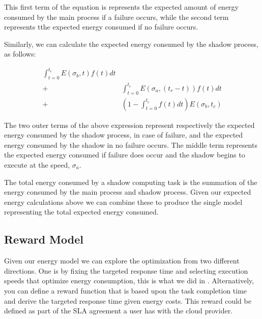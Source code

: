 This first term of the equation is represents the expected amount of
energy consumed by the main process if a failure occurs, while the
second term represents tthe expected energy consumed if no failure
occurs.

Similarly, we can calculate the expected energy consumed by the shadow
process, as follows:

\begin{equation}
\begin{split}
\int_{t=0}^{t_c}E(\sigma_b,t)f(t)dt \\
+& \int_{t=0}^{t_c}E(\sigma_a,(t_r-t))f(t)dt \\
+& (1-\int_{t=0}^{t_c}f(t)dt)E(\sigma_b,t_c)
\end{split}
\end{equation}

The two outer terms of the above expression represent respectively the
expected energy consumed by the shadow process, in case of failure,
and the expected energy consumed by the shadow in no failure
occurs. The middle term represents the expected energy consumed if
failure does occur and the shadow begins to execute at the speed,
$\sigma_a$.

The total energy consumed by a shadow computing task is the summation
of the energy consumed by the main process and shadow process. Given
our expected energy calculations above we can combine these to produce
the single model representing the total expected energy consumed.

\subsection{Reward Model}
\label{reward_model}

Given our energy model we can explore the optimization from two
different directions. One is by fixing the targeted response time and
selecting execution speeds that optimize energy consumption, this is
what we did in \cite{shadow_closer2013}. Alternatively, you can define
a reward function that is based upon the task completion time and
derive the targeted response time given energy costs. This reward
could be defined as part of the SLA agreement a user has with the
cloud provider.


